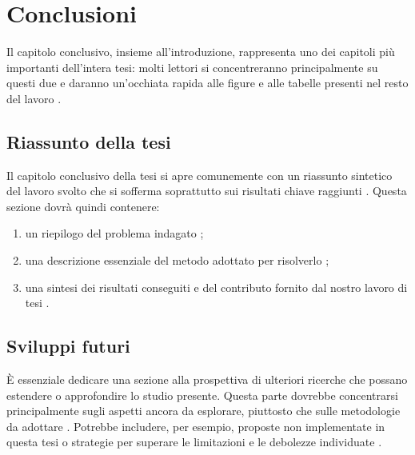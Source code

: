 \chapter{Conclusioni}
\label{chap:conclusioni}

\acresetall

Il capitolo conclusivo, insieme all'introduzione, rappresenta uno dei capitoli più importanti dell'intera tesi: molti lettori si concentreranno principalmente su questi due e daranno un'occhiata rapida alle figure e alle tabelle presenti nel resto del lavoro \cite{tuni2019guide}.

\section{Riassunto della tesi}

Il capitolo conclusivo della tesi si apre comunemente con un riassunto sintetico del lavoro svolto che si sofferma soprattutto sui risultati chiave raggiunti \cite{fau2023thesis}. Questa sezione dovrà quindi contenere:
\begin{enumerate}

\item un riepilogo del problema indagato \cite{pfandzelter2022thesis};

\item una descrizione essenziale del metodo adottato per risolverlo \cite{pfandzelter2022thesis};

\item una sintesi dei risultati conseguiti \cite{zobel2015writing} e del contributo fornito dal nostro lavoro di tesi \cite{aceto2023paper}.

\end{enumerate}

\section{Sviluppi futuri}

È essenziale dedicare una sezione alla prospettiva di ulteriori ricerche che possano estendere o approfondire lo studio presente. Questa parte dovrebbe concentrarsi principalmente sugli aspetti ancora da esplorare, piuttosto che sulle metodologie da adottare \cite{fau2023thesis}. Potrebbe includere, per esempio, proposte non implementate in questa tesi o strategie per superare le limitazioni e le debolezze individuate \cite{pfandzelter2022thesis}.
